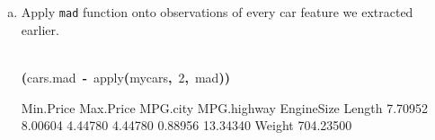 \documentclass{article}
\newcommand{\hlnumber}[1]{\textcolor[rgb]{0.0823529411764706,0.0784313725490196,0.709803921568627}{#1}}%
\newcommand{\hlfunctioncall}[1]{\textcolor[rgb]{1,0,0}{#1}}%
\newcommand{\hlkeyword}[1]{\textcolor[rgb]{0,0,0}{\textbf{#1}}}%
\newcommand{\hlassignement}[1]{\textcolor[rgb]{0.215686274509804,0.215686274509804,0.384313725490196}{\textbf{#1}}}%
\newcommand{\hlsymbol}[1]{\textcolor[rgb]{0,0,0}{#1}}%
\newcommand{\hlprompt}[1]{\textcolor[rgb]{0,0,0}{#1}}%
\newcommand{\hlstd}[1]{\textcolor[rgb]{0,0,0}{#1}}%
\newenvironment{Houtput}{\raggedright}{%
%
}
\begin{document}
    \section{}
    \begin{enumerate}[(a)]
        \item Apply \verb=mad= function onto observations of every car feature we extracted earlier.
\begin{Houtput}
\hspace*{\fill}\\
\hlstd{}\ttfamily\noindent
\hlprompt{\usebox{\hlnormalsizeboxgreaterthan}{\ }}\hlkeyword{(}\hlsymbol{cars.mad}{\ }\hlassignement{\usebox{\hlnormalsizeboxlessthan}-}{\ }\hlfunctioncall{apply}\hlkeyword{(}\hlsymbol{mycars}\hlkeyword{,}{\ }\hlnumber{2}\hlkeyword{,}{\ }\hlsymbol{mad}\hlkeyword{)}\hlkeyword{)}\mbox{}
\normalfont
\hspace*{\fill}\\
\hlstd{}\begin{Schunk}
\begin{Soutput}
  Min.Price   Max.Price    MPG.city MPG.highway  EngineSize      Length 
    7.70952     8.00604     4.44780     4.44780     0.88956    13.34340 
     Weight 
  704.23500 
\end{Soutput}


\end{Schunk}
\end{Houtput}
\end{enumerate}
\end{document}
